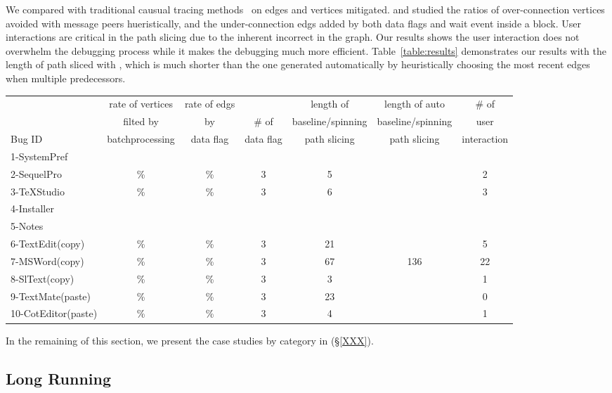 We compared \xxx with traditional causual tracing methods~\cite{XXXX} on edges
and vertices \xxx mitigated. and studied the ratios of over-connection vertices
avoided with message peers hueristically, and the under-connection edgs added by
both data flags and wait event inside a block. User interactions are critical in
the path slicing due to the inherent incorrect in the graph. Our results shows
the user interaction does not overwhelm the debugging process while it makes
the debugging much more efficient. Table~\ref{table:results} demonstrates our
results with the length of path sliced with \xxx, which is much shorter than the
one generated automatically by heuristically choosing the most recent edges when
multiple predecessors.


\begin{table*}[ht]
\footnotesize
\centering
  \begin{tabularx}{\textwidth}{l|cccccc}
 	   & rate of vertices   & rate of edgs&           & length of \xxx      & length of auto      & \# of\\
       & filted by          & by          & \# of     & baseline/spinning   & baseline/spinning   &user\\
Bug ID & batchprocessing    & data flag   & data flag & path slicing        & path slicing        &interaction \\
\hline
\hline
 1-SystemPref&&&&&&\\
 2-SequelPro & \% & \% & 3 & 5 &  & 2  \\
 3-TeXStudio & \% & \% & 3 & 6 &  & 3 \\
 4-Installer &&&&&& \\
 5-Notes &&&&&& \\
 6-TextEdit(copy)&\% &\% & 3 & 21 & & 5\\
 7-MSWord(copy)&\%&\%& 3 & 67 & 136 & 22\\
 8-SlText(copy)&\%&\%&3 & 3 & & 1\\
 9-TextMate(paste) & \%&\% &3 & 23& & 0\\
 10-CotEditor(paste) & \%& \%& 3 & 4 & & 1\\
\hline
  \end{tabularx}
  \caption{Graph Comparison}
  \label{table:results}
\end{table*}

In the remaining of this section, we present the case studies by category in (\S\ref{XXX}). 

\subsection{Long Running}

